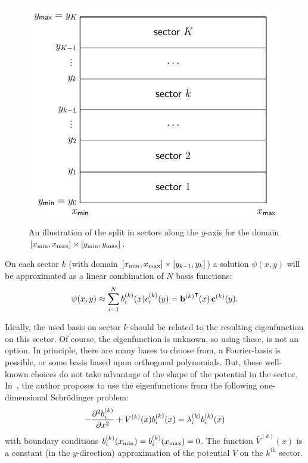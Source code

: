 \begin{figure}
  \begin{center}
    \includegraphics[width=.6\textwidth]{img/chapter3/2dsectors.pdf}
    \caption{\label{fig:c3_2dsectors} An illustration of the split in sectors along the $y$-axis for the domain $[{x_{\text{min}}}, {x_{\text{max}}}]\times[{y_{\text{min}}}, {y_{\text{max}}}]$.}
  \end{center}
\end{figure}

On each sector $k$ (with domain $[{x_{\text{min}}}, {x_{\text{max}}}]\times[y_{k-1}, y_k]$) a solution $\psi(x, y)$ will be approximated as a linear combination of $N$ basis functions:
\begin{equation}\label{equ:c3_lincomb_basis}
  \psi(x, y) \approx \sum_{i=1}^{N} b_i^{(k)}(x) c_i^{(k)}(y) = {{\vb{b}^{(k)}}}^\intercal(x) \, \vb{c}^{(k)}(y) \text{.}
\end{equation}

Ideally, the used basis on sector $k$ should be related to the resulting eigenfunction on this sector. Of course, the eigenfunction is unknown, so using these, is not an option. In principle, there are many bases to choose from, a Fourier-basis is possible, or some basis based upon orthogonal polynomials. But, these well-known choices do not take advantage of the shape of the potential in the sector. In~\cite{ixaru_new_2010}, the author proposes to use the eigenfunctions from the following one-dimensional Schrödinger problem:
\begin{equation}\label{equ:c3_one_dimensional_schrodinger}
  -\pdv[2]{b_i^{(k)}}{x} + \bar{V}^{(k)}(x)b_i^{(k)}(x) = \lambda_i^{(k)} b_i^{(k)}(x)
\end{equation}
with boundary conditions $b_i^{(k)}({x_{\text{min}}}) = b_i^{(k)}({x_{\text{max}}}) = 0$. The function $\bar{V}^{(k)}(x)$ is a constant (in the $y$-direction) approximation of the potential $V$ on the $k^\text{th}$ sector.

